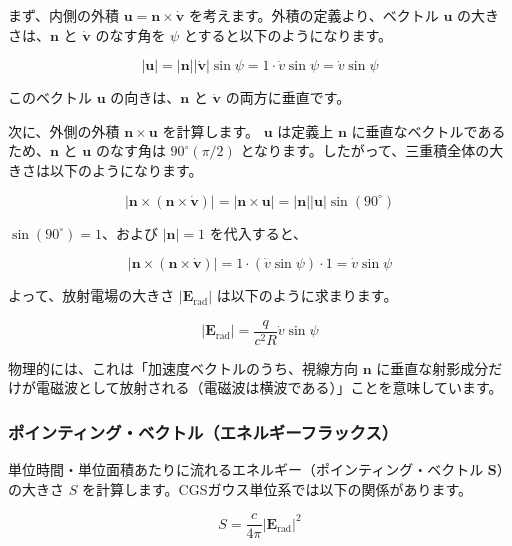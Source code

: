 \documentclass[a4paper,11pt]{bxjsarticle} %
\begin{document}
まず、内側の外積 $\bm{u} = \bm{n} \times \dot{\bm{v}}$ を考えます。外積の定義より、ベクトル $\bm{u}$ の大きさは、$\bm{n}$ と $\dot{\bm{v}}$ のなす角を $\psi$ とすると以下のようになります。

\begin{equation}
    |\bm{u}| = |\bm{n}| |\dot{\bm{v}}| \sin\psi = 1 \cdot \dot{v} \sin\psi = \dot{v} \sin\psi
\end{equation}

このベクトル $\bm{u}$ の向きは、$\bm{n}$ と $\dot{\bm{v}}$ の両方に垂直です。

次に、外側の外積 $\bm{n} \times \bm{u}$ を計算します。
$\bm{u}$ は定義上 $\bm{n}$ に垂直なベクトルであるため、$\bm{n}$ と $\bm{u}$ のなす角は $90^\circ (\pi/2)$ となります。したがって、三重積全体の大きさは以下のようになります。

\begin{equation}
    |\bm{n} \times (\bm{n} \times \dot{\bm{v}})| = |\bm{n} \times \bm{u}| = |\bm{n}| |\bm{u}| \sin(90^\circ)
\end{equation}

$\sin(90^\circ)=1$、および $|\bm{n}|=1$ を代入すると、

\begin{equation}
    |\bm{n} \times (\bm{n} \times \dot{\bm{v}})| = 1 \cdot (\dot{v} \sin\psi) \cdot 1 = \dot{v} \sin\psi
\end{equation}

よって、放射電場の大きさ $|\bm{E}_{\mathrm{rad}}|$ は以下のように求まります。

\begin{equation}
    |\bm{E}_{\mathrm{rad}}| = \frac{q}{c^2 R} \dot{v} \sin\psi
\end{equation}

物理的には、これは「加速度ベクトルのうち、視線方向 $\bm{n}$ に垂直な射影成分だけが電磁波として放射される（電磁波は横波である）」ことを意味しています。

\subsubsection{ポインティング・ベクトル（エネルギーフラックス）}

単位時間・単位面積あたりに流れるエネルギー（ポインティング・ベクトル $\bm{S}$）の大きさ $S$ を計算します。CGSガウス単位系では以下の関係があります。

\begin{equation}
    S = \frac{c}{4\pi} |\bm{E}_{\mathrm{rad}}|^2
\end{equation}
\end{document}
